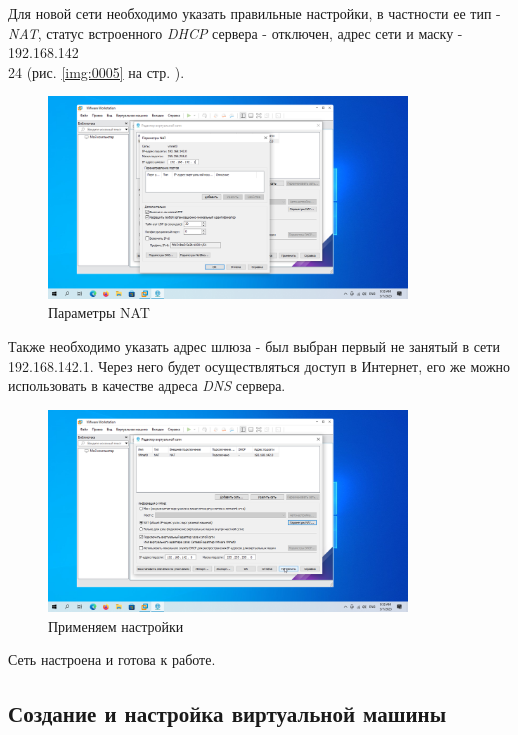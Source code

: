 \documentclass[a4paper]{article}
\begin{document}
  Для новой сети необходимо указать правильные настройки, в частности ее тип - \textit{NAT},
  статус встроенного \textit{DHCP} сервера - отключен, адрес сети и маску - 192.168.142\\24
  (рис. \ref{img:0005} на стр. \pageref{img:0005}).

  \begin{figure}[H]
    \centering
    \includegraphics[width=0.85\textwidth]{9_0006}
    \caption{Параметры NAT}
    \label{img:0006}
  \end{figure}

  Также необходимо указать адрес шлюза - был выбран первый не занятый в сети 192.168.142.1.
  Через него будет осуществляться доступ в Интернет, его же можно использовать в качестве
  адреса \textit{DNS} сервера.

  \begin{figure}[H]
    \centering
    \includegraphics[width=0.85\textwidth]{9_0007}
    \caption{Применяем настройки}
    \label{img:0007}
  \end{figure}

  Сеть настроена и готова к работе.

  \subsection{Создание и настройка виртуальной машины}
\end{document}
